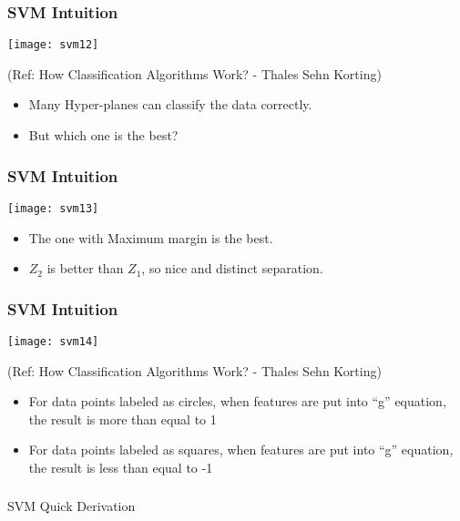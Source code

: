 \begin{frame}[fragile] \frametitle{SVM Intuition}

\begin{center}
\texttt{[image: svm12]}

\tiny{(Ref: How Classification Algorithms Work? - Thales Sehn Korting)}
\end{center}
\begin{itemize}
\item Many Hyper-planes can classify the data correctly.
\item But which one is the best?
\end{itemize}
\end{frame}

\begin{frame}[fragile] \frametitle{SVM Intuition}

\begin{center}
\texttt{[image: svm13]}
\end{center}
\begin{itemize}
\item The one with Maximum margin is the best.
\item $Z_2$ is better than $Z_1$, so nice and distinct separation.
\end{itemize}
\end{frame}

\begin{frame}[fragile] \frametitle{SVM Intuition}

\begin{center}
\texttt{[image: svm14]}

\tiny{(Ref: How Classification Algorithms Work? - Thales Sehn Korting)}
\end{center}
\begin{itemize}
\item For data points labeled as circles, when features are put into ``g'' equation, the result is more than equal to 1
\item For data points labeled as squares, when features are put into ``g'' equation, the result is less than equal to -1
\end{itemize}
\end{frame}

\begin{frame}[fragile]\frametitle{}
\begin{center}
{\Large SVM Quick Derivation}
\end{center}
\end{frame}

